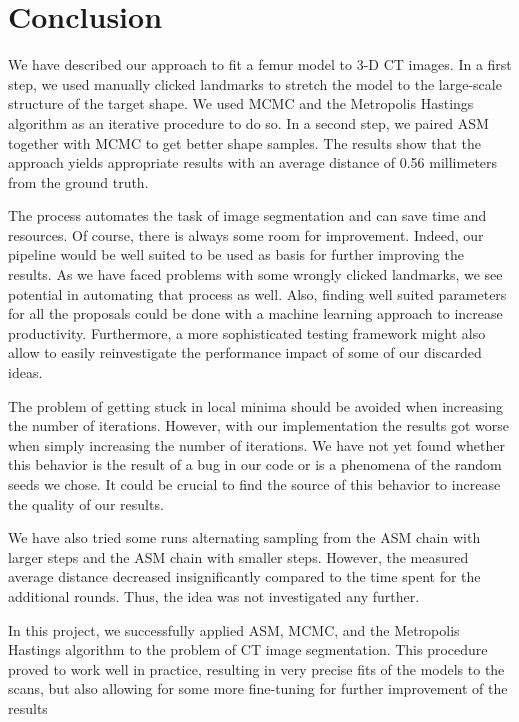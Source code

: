 \section{Conclusion}
\label{sec:conclusion}

We have described our approach to fit a femur model to 3-D CT images.
In a first step, we used manually clicked landmarks to stretch the model to the large-scale structure of the target shape.
We used MCMC and the Metropolis Hastings algorithm as an iterative procedure to do so.
In a second step, we paired ASM together with MCMC to get better shape samples.
The results show that the approach yields appropriate results with an average distance of 0.56 millimeters from the ground truth.

The process automates the task of image segmentation and can save time and resources.
Of course, there is always some room for improvement.
Indeed, our pipeline would be well suited to be used as basis for further improving the results.
As we have faced problems with some wrongly clicked landmarks, we see potential in automating that process as well.
Also, finding well suited parameters for all the proposals could be done with a machine learning approach to increase productivity.
Furthermore, a more sophisticated testing framework might also allow to easily reinvestigate the performance impact of some of our discarded ideas.

The problem of getting stuck in local minima should be avoided when increasing the number of iterations.
However, with our implementation the results got worse when simply increasing the number of iterations.
We have not yet found whether this behavior is the result of a bug in our code or is a phenomena of the random seeds we chose.
It could be crucial to find the source of this behavior to increase the quality of our results.

We have also tried some runs alternating sampling from the ASM chain with larger steps and the ASM chain with smaller steps.
However, the measured average distance decreased insignificantly compared to the time spent for the additional rounds.
Thus, the idea was not investigated any further.

In this project, we successfully applied ASM, MCMC, and the Metropolis Hastings algorithm to the problem of CT image segmentation.
This procedure proved to work well in practice, resulting in very precise fits of the models to the scans, but also allowing for some more fine-tuning for further improvement of the results